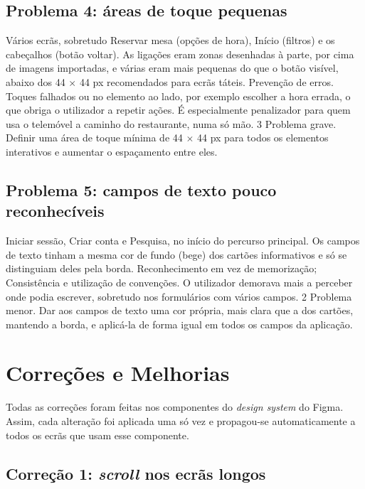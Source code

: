 \subsection{Problema 4: áreas de toque pequenas}

\problema
  {Vários ecrãs, sobretudo Reservar mesa (opções de hora), Início (filtros) e os cabeçalhos
   (botão voltar).}
  {As ligações eram zonas desenhadas à parte, por cima de imagens importadas, e várias eram mais
   pequenas do que o botão visível, abaixo dos 44 $\times$ 44 px recomendados para ecrãs
   táteis.}
  {Prevenção de erros.}
  {Toques falhados ou no elemento ao lado, por exemplo escolher a hora errada, o que obriga o
   utilizador a repetir ações. É especialmente penalizador para quem usa o telemóvel a caminho do
   restaurante, numa só mão.}
  {3 \textperiodcentered{} Problema grave.}
  {Definir uma área de toque mínima de 44 $\times$ 44 px para todos os elementos interativos e
   aumentar o espaçamento entre eles.}

\subsection{Problema 5: campos de texto pouco reconhecíveis}

\problema
  {Iniciar sessão, Criar conta e Pesquisa, no início do percurso principal.}
  {Os campos de texto tinham a mesma cor de fundo (bege) dos cartões informativos e só se
   distinguiam deles pela borda.}
  {Reconhecimento em vez de memorização; Consistência e utilização de convenções.}
  {O utilizador demorava mais a perceber onde podia escrever, sobretudo nos formulários com
   vários campos.}
  {2 \textperiodcentered{} Problema menor.}
  {Dar aos campos de texto uma cor própria, mais clara que a dos cartões, mantendo a borda, e
   aplicá-la de forma igual em todos os campos da aplicação.}

\section{Correções e Melhorias}
\label{sec:correcoes}

Todas as correções foram feitas nos componentes do \textit{design system} do Figma. Assim, cada
alteração foi aplicada uma só vez e propagou-se automaticamente a todos os ecrãs que usam esse
componente.

\subsection{Correção 1: \textit{scroll} nos ecrãs longos}

